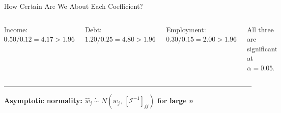 \documentclass[8pt,aspectratio=169]{beamer}
\newcommand{\bottomnote}[1]{%
\vfill
\vspace{-2mm}
\textcolor{mllavender2}{\rule{\textwidth}{0.4pt}}
\vspace{1mm}
\footnotesize
\textbf{#1}
}
\begin{document}
\begin{frame}[t]{How Certain Are We About Each Coefficient?}
\begin{columns}[T]
{{\vspace{2mm}
Income: $0.50/0.12 = 4.17 > 1.96$ \checkmark

Debt: $1.20/0.25 = 4.80 > 1.96$ \checkmark

Employment: $0.30/0.15 = 2.00 > 1.96$ \checkmark

\vspace{1mm}
All three are significant at $\alpha=0.05$.
}}
\end{columns}

\bottomnote{Asymptotic normality: $\hat{w}_j \;\dot\sim\; N(w_j,\, [\mathcal{I}^{-1}]_{jj})$ for large $n$}
\end{frame}

\end{document}
